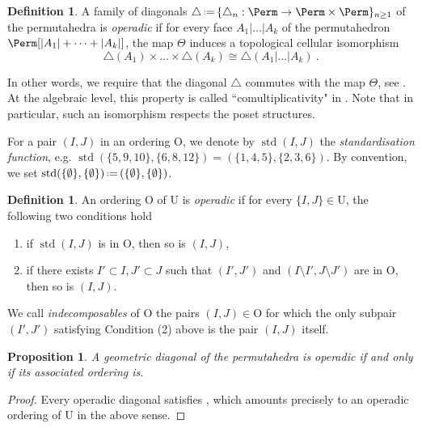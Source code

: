 \documentclass{amsart}
\newcommand{\darkblue}{\color{darkblue}} %
\newtheorem{proposition}[theorem]{Proposition}
\theoremstyle{definition}
\newtheorem{definition}[theorem]{Definition}
\newcommand{\Un}{\mathrm{U}} %
\newcommand{\Or}{\mathrm{O}} %
\newcommand{\eqdef}{\mbox{\,\raisebox{0.2ex}{\scriptsize\ensuremath{\mathrm:}}\ensuremath{=}\,}} %
\DeclareMathOperator{\std}{std}
\newcommand{\defn}[1]{\textsl{\darkblue #1}} %
\begin{document}
\begin{definition}
\label{def:operadic diagonal}
A family of diagonals $\triangle \eqdef \{\triangle_n : \Perm \to \Perm \times \Perm\}_{n\geq 1}$ of the permutahedra is \defn{operadic} if for every face $A_1 | \ldots | A_k$ of the permutahedron $\Perm[|A_1|+\cdots + |A_k|]$, the map $\Theta$ induces a topological cellular isomorphism \[  \triangle(A_1) \times \ldots \times \triangle(A_k) \cong \triangle(A_1 | \ldots | A_k) \ . \]
\end{definition}
In other words, we require that the diagonal $\triangle$ commutes with the map $\Theta$, see \cite[Section 4.2]{LA21}.
At the algebraic level, this property is called ``comultiplicativity" in \cite{SaneblidzeUmble04}.
Note that in particular, such an isomorphism respects the poset structures. 

For a pair $(I,J)$ in an ordering $\Or$, we denote by $\std(I,J)$ the \defn{standardisation function}, e.g. $\std(\{5,9,10\},\{6,8,12\}) = (\{1,4,5\},\{2,3,6\})$.
By convention, we set $\std(\{\emptyset\},\{\emptyset\}) \eqdef (\{\emptyset\},\{\emptyset\})$.

\begin{definition}
\label{def:operadic-ordering}
An ordering $\Or$ of $\Un$ is \defn{operadic} if for every $\{I,J\} \in \Un$, the following two conditions hold
\begin{enumerate}
\item if $\std(I,J)$ is in $\Or$, then so is $(I,J)$,
\item if there exists $I'\subset I, J'\subset J$ such that $(I',J')$ and $(I\setminus I',J\setminus J')$ are in $\Or$, then so is $(I,J)$.
\end{enumerate}
\end{definition}

We call \defn{indecomposables} of $\Or$ the pairs $(I,J) \in \Or$ for which the only subpair $(I',J')$ satisfying Condition (2) above is the pair $(I,J)$ itself.

\begin{proposition}
\label{prop:equiv-operadic}
A geometric diagonal of the permutahedra is operadic if and only if its associated ordering is. 
\end{proposition}

\begin{proof}
Every operadic diagonal satisfies \cite[Prop.~4.14]{LA21}, which amounts precisely to an operadic ordering of $\Un$ in the above sense. 
\end{proof}
\end{document}
